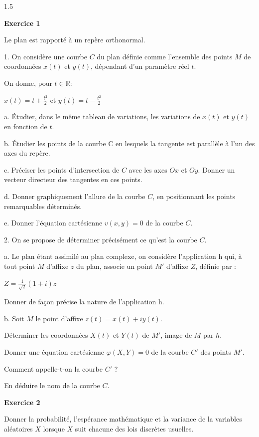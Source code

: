 \documentclass[12pt]{article}
\begin{document}
\begin{spacing}{1.5}

\textbf{Exercice 1}

Le plan est rapporté à un repère orthonormal. 

1. On considère une courbe $C$ du plan définie comme l'ensemble des points $M$ de coordonnées $x(t)$ et $y(t)$, dépendant d'un paramètre réel $t$. 

On donne, pour $t\in \mathbb{R} $: 

$x(t)=t+\frac{t^2}{2}$ et $y(t)=t-\frac{t^2}{2}$

a. Étudier, dans le même tableau de variations, les variations de $x(t)$ et $y(t)$ en fonction de $t$. 

b. Étudier les points de la courbe C en lesquels la tangente est parallèle à l'un des axes du repère. 

c. Préciser les points d'intersection de $C$ avec les axes $Ox$ et $Oy$. Donner un vecteur 
directeur des tangentes en ces points. 

d. Donner graphiquement l'allure de la courbe $C$, en positionnant les points remarquables 
déterminés. 

e. Donner l'équation cartésienne $v(x, y) = 0$ de la courbe $C$. 

2. On se propose de déterminer précisément ce qu'est la courbe $C$. 

a. Le plan étant assimilé au plan complexe, on considère l'application h qui, à tout point $M$ 
d'affixe $z$ du plan, associe un point $M'$ d'affixe $Z$, définie par : 

$Z = \frac{1}{\sqrt{2}}(1+i)z$

 Donner de façon précise la nature de l'application h. 

b. Soit $M$  le point d'affixe $z(t) = x(t) + iy(t)$. 

Déterminer les coordonnées $X(t)$ et $Y(t)$ de $M'$, image de $M$ par $h$. 

Donner une équation cartésienne $\varphi (X,Y)=0$ de la courbe $C'$ des points $M'$. 

Comment appelle-t-on la courbe $C'$ ? 

En déduire le nom de la courbe $C$. 


\medskip\textbf{Exercice 2}

 Donner la probabilité, l'espérance mathématique et la variance de la variables aléatoires $X$ lorsque $X$ suit chacune des lois discrètes usuelles.
 

\end{spacing}
\end{document}
